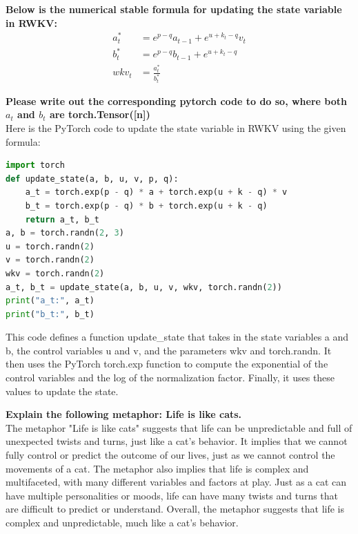 \documentclass[11pt]{article}
\begin{document}
\begin{tcolorbox}[colback=white,colframe=black!75!black,title=RWKV-4-Raven-14B]
\textbf{Below is the numerical stable formula for updating the state variable in RWKV:}\\
\begin{equation*}
    \begin{aligned}
    a_t^* &= e^{p-q} a_{t-1} + e^{u+k_{t} - q} v_t\\
    b_t^* &= e^{p-q} b_{t-1} + e^{u+k_{t} - q}\\
    wkv_t &=\frac{a_t^*}{b_t^*}
    \end{aligned}
\end{equation*}

\textbf{Please write out the corresponding pytorch code to do so, where both $a_t$ and $b_t$ are torch.Tensor([n])}\\


Here is the PyTorch code to update the state variable in RWKV using the given formula:
\begin{tcolorbox}
\begin{lstlisting}[language=Python]
import torch
def update_state(a, b, u, v, p, q):
    a_t = torch.exp(p - q) * a + torch.exp(u + k - q) * v
    b_t = torch.exp(p - q) * b + torch.exp(u + k - q)
    return a_t, b_t
a, b = torch.randn(2, 3)
u = torch.randn(2)
v = torch.randn(2)
wkv = torch.randn(2)
a_t, b_t = update_state(a, b, u, v, wkv, torch.randn(2))
print("a_t:", a_t)
print("b_t:", b_t)
\end{lstlisting}
\end{tcolorbox}
This code defines a function update\_state that takes in the state variables a and b, the control variables u and v, and the parameters wkv and torch.randn. It then uses the PyTorch torch.exp function to compute the exponential of the control variables and the log of the normalization factor. Finally, it uses these values to update the state.\\
\end{tcolorbox}
 
\begin{tcolorbox}[colback=white,colframe=black!75!black,title=RWKV-4-Raven-14B,float=h]
\textbf{Explain the following metaphor: Life is like cats.}\\

The metaphor "Life is like cats" suggests that life can be 
unpredictable and full of unexpected twists and turns, just like a cat's behavior. It implies that we cannot fully control or predict the outcome of our lives, just as we cannot control the movements of a cat. The metaphor also implies that life is complex and multifaceted, with many different variables and factors at play. Just as a cat can have multiple personalities or moods, life can have many twists and turns that are difficult to predict or understand. Overall, the metaphor suggests that life is complex and unpredictable, much like a cat's behavior.\\
\end{tcolorbox}
\end{document}
